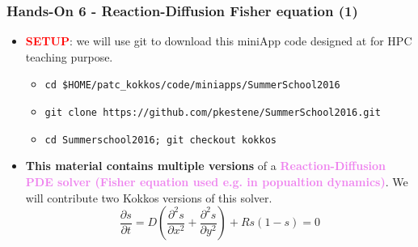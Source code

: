 \begin{frame}
  \frametitle{Hands-On 6 - Reaction-Diffusion Fisher equation (1)}

  \begin{itemize}
  \item \textcolor{red}{\textbf{SETUP}}: we will use git to download this miniApp code designed at  for HPC teaching purpose.
    \begin{itemize}
    \item \texttt{cd \$HOME/patc\_kokkos/code/miniapps/SummerSchool2016}
    \item \texttt{git clone https://github.com/pkestene/SummerSchool2016.git}
    \item \texttt{cd Summerschool2016; git checkout kokkos}
    \end{itemize}
  \item \textbf{This material contains multiple versions} of a \textcolor{violet}{\textbf{Reaction-Diffusion PDE solver (Fisher equation used e.g. in popualtion dynamics)}}. We will contribute two Kokkos versions of this solver.
    $$ \frac{\partial s}{\partial t} = D \left( \frac{\partial^2 s}{\partial x^2} + \frac{\partial^2 s}{\partial y^2} \right) + R s (1-s) = 0$$
  \end{itemize}
  
\end{frame}

